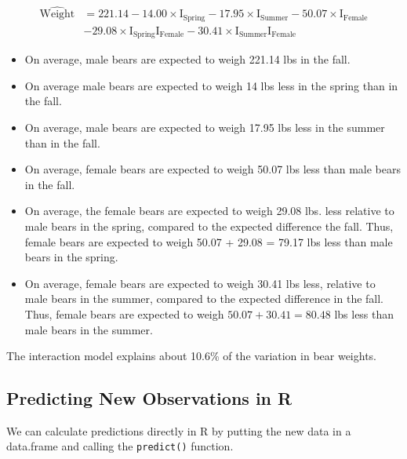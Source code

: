 \documentclass[]{book}
\providecommand{\tightlist}{%
  \setlength{\itemsep}{0pt}\setlength{\parskip}{0pt}}
\begin{document}
\[
\begin{aligned}
\widehat{\text{Weight}} &= 221.14 -14.00 \times\text{I}_{\text{Spring}} -17.95\times\text{I}_{\text{Summer}} -50.07\times\text{I}_{\text{Female}} \\
&-29.08\times\text{I}_{\text{Spring}}\text{I}_{\text{Female}} -30.41\times\text{I}_{\text{Summer}}\text{I}_{\text{Female}}
\end{aligned}
\]

\begin{itemize}
\tightlist
\item
  On average, male bears are expected to weigh 221.14 lbs in the fall.\\
\item
  On average male bears are expected to weigh 14 lbs less in the spring
  than in the fall.\\
\item
  On average, male bears are expected to weigh 17.95 lbs less in the
  summer than in the fall.\\
\item
  On average, female bears are expected to weigh 50.07 lbs less than
  male bears in the fall.\\
\item
  On average, the female bears are expected to weigh 29.08 lbs. less
  relative to male bears in the spring, compared to the expected
  difference the fall. Thus, female bears are expected to weigh 50.07 +
  29.08 = 79.17 lbs less than male bears in the spring.\\
\item
  On average, female bears are expected to weigh 30.41 lbs less,
  relative to male bears in the summer, compared to the expected
  difference in the fall. Thus, female bears are expected to weigh
  \(50.07 + 30.41 = 80.48\) lbs less than male bears in the summer.
\end{itemize}

The interaction model explains about 10.6\% of the variation in bear
weights.

\subsection{Predicting New Observations in
R}\label{predicting-new-observations-in-r}

We can calculate predictions directly in R by putting the new data in a
data.frame and calling the \texttt{predict()} function.
\end{document}
